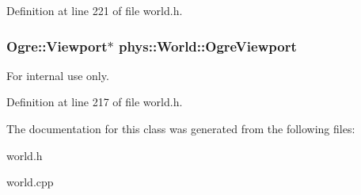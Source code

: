 Definition at line 221 of file world.h.

\hypertarget{classphys_1_1World_ae8ece0488ad1897bbd477f83a567af04}{
\subsubsection[{OgreViewport}]{\setlength{\rightskip}{0pt plus 5cm}Ogre::Viewport$\ast$ {\bf phys::World::OgreViewport}}}
\label{da/ddf/classphys_1_1World_ae8ece0488ad1897bbd477f83a567af04}
\begin{DoxyInternal}{For internal use only.}
\end{DoxyInternal}


Definition at line 217 of file world.h.



The documentation for this class was generated from the following files:\begin{DoxyCompactItemize}
\item 
world.h\item 
world.cpp\end{DoxyCompactItemize}
